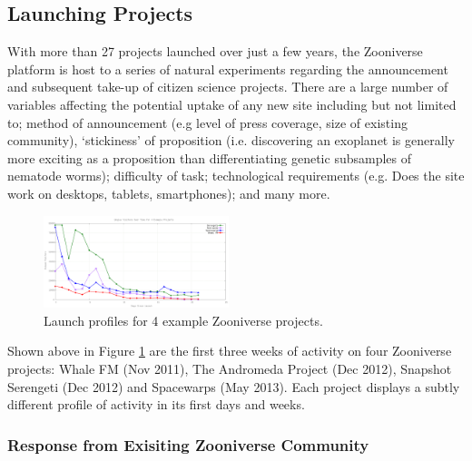 \documentclass{sigchi}
\begin{document}

\subsection{Launching Projects}

With more than 27 projects launched over just a few years, the Zooniverse platform is host to a series of natural experiments regarding the announcement and subsequent take-up of citizen science projects. There are a large number of variables affecting the potential uptake of any new site including but not limited to; method of announcement (e.g level of press coverage, size of existing community), `stickiness' of proposition (i.e. discovering an exoplanet is generally more exciting as a proposition than differentiating genetic subsamples of nematode worms); difficulty of task; technological requirements (e.g. Does the site work on desktops, tablets, smartphones); and many more.

\begin{figure}
\centering
\includegraphics[width=0.48\textwidth]{data/launch-profiles/launch-profiles.png}
\caption{Launch profiles for 4 example Zooniverse projects.}
\label{launchprofiles}
\end{figure}

Shown above in Figure \ref{launchprofiles} are the first three weeks of activity on four Zooniverse projects: Whale FM (Nov 2011), The Andromeda Project (Dec 2012), Snapshot Serengeti (Dec 2012) and Spacewarps (May 2013). Each project displays a subtly different profile of activity in its first days and weeks. %


\subsubsection{Response from Exisiting Zooniverse Community}
\end{document}
